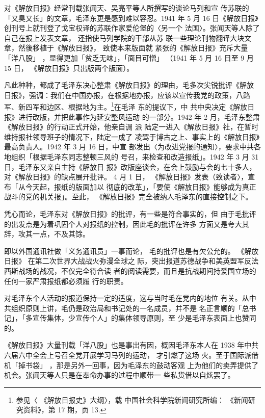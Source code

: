 对《解放日报》经常刊载张闻天、吴亮平等人所撰写的谈论马列和宣
传苏联的「又臭又长」的文章，毛泽东更是感到难以容忍。1941 年 5 月 16
日《解放日报》创刊号上就刊登了戈宝权译的苏联作家爱伦堡的〈另一个
法国〉。张闻天等人除了自己在报上发表文章，
还指使马列学院的干部从苏
联一些理论刊物翻译大块文章，然後移植于《解放日报》，
致使本来版面就
紧张的《解放日报》充斥大量「洋八股」
，显得更加「贫乏无味」，「面目可憎」
（1941 年 5 月 16 日至 9 月 15 日，
《解放日报》只出版两个版面）。

凡此种种，都成了毛泽东决心整肃《解放日报》的理由，毛多次尖锐批评《解放
日报》，强调：我们在中国办报，在根据地办报，应该以宣传我党的政策，八路
军、新四军和边区、根据地为主。\footnote{参见〈 《解放日报史》大纲〉，载
中国社会科学院新闻研究所编： 《新闻研究资料》，第 17 期，页 13.}在毛泽
东的提议下，中 共中央决定《解放日报》进行改版，并把此事作为延安整风运动
的一部分。1942 年 2 月，毛泽东整肃《解放日报》的行动正式开始，他亲自调
派 陆定一进入《解放日报》社，在暂时维持报社领导班子的情况下，陆定一成了
凌驾于博古之上、事实上的《解放日报》最高负责人。1942 年 3 月 16 日，中宣
部发出〈为改进党报的通知〉，要求中共各地组织「根据毛泽东同志整顿三风的
号召，来检查和改造报纸」。1942 年 3 月 31 日，毛泽东又亲自主持《解放日
报》改版座谈会，在会上鼓励与会的七十多人，对《解放日报》的缺点展开批评。
4 月 1 日， 《解放日报》发表（致读者〉，宣布「从今天起，报纸的版面加以
彻底的改革」，「要使《解放日报》能够成为真正战斗的党的机关报」。至此，
《解放日报》完全被纳人毛泽东的直接控制之下。

凭心而论，毛泽东对《解放日报》的批评，有一些是符合事实的，但
由于毛批评的出发点是为着巩固个人对报纸的控制，因此毛的批评在许多
方面又是夸大其辞，攻其一点，不及其馀。

即以外国通讯社做「义务通讯员」一事而论，
毛的批评也是有欠公允的。
《解放日报》
在第二次世界大战战火弥漫全球之
际，突出报道苏德战争和美英盟军反法西斯战场的战况，不仅完全符合读
者的阅读需要，而且是抗战期间持爱国立场的任何一家严肃报纸都必须履
行的职责。

对毛泽东个人活动的报道保持一定的适度，这与当时毛在党内的地位
有关。从中共组织原则上讲，毛仍是政治局和书记处的一名成员，并不是
名正言顺的「总书记」，「多宣传集体，少宣传个人」的集体领导原则，至
少是毛泽东表面上也赞同的。

《解放日报》大量刊载「洋八股」也是事出有因，概因毛泽东本人在
1938 年中共六届六中全会上号召全党开展学习马列的运动，
才引燃了这场
火。至于国际派借机「掉书袋」
，那是另外一回事，因为毛泽东的鼓动客观
上为他们的卖弄提供了机会。张闻天等人只是在奉命办事的过程中顺带一
些私货借以自炫罢了。

